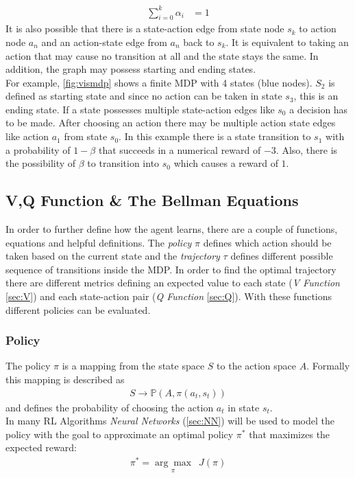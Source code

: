 \begin{align}
	\sum_{i=0}^{k} \alpha_i &= 1
\end{align}
\newline
It is also possible that there is a state-action edge from state node $s_k$ to action node $a_n$ and an action-state edge from $a_n$ back to $s_k$. 
It is equivalent to taking an action that may cause no transition at all and the state stays the same. In addition, the graph may possess starting and ending states.\\
For example, \cref{fig:vismdp} shows a finite MDP with 4 states (blue nodes). 
$S_2$ is defined as starting state and since no action can be taken in state $s_3$, this is an ending state. 
If a state possesses multiple state-action edges like $s_0$ a decision has to be made. 
After choosing an action there may be multiple action state edges like action $a_1$ from state $s_0$. 
In this example there is a state transition to $s_1$ with a probability of $1-\beta$ that succeeds in a numerical reward of $-3$. 
Also, there is the possibility of $\beta$ to transition into $s_0$ which causes a reward of $1$.

\newpage

\subsection{V,Q Function \& The Bellman Equations}
In order to further define how the agent learns, there are a couple of functions, equations and helpful definitions. 
The \emph{policy} $\pi$ defines which action should be taken based on the current state and the \emph{trajectory} $\tau$ 
defines different possible sequence of transitions inside the MDP. 
In order to find the optimal trajectory there are different metrics defining an expected value to each state (\emph{V Function} \cref{sec:V}) and each state-action pair (\emph{Q Function} \cref{sec:Q}). 
With these functions different policies can be evaluated. 

\subsubsection{Policy}
The policy $\pi$ is a mapping from the state space $S$ to the action space $A$. Formally this mapping is described as
\begin{align*}
	S \to \mathbb{P}(A, \pi (a_t,s_t))
\end{align*}
\newline
and defines the probability of choosing the action $a_t$ in state $s_t$.\\
In many RL Algorithms \emph{Neural Networks} (\cref{sec:NN}) will be used to model the policy with 
the goal to approximate an optimal policy $\pi^*$ that maximizes the expected reward:
\begin{align*}
	\pi^* = \underset{\pi} {\arg \max}\enspace J(\pi)
\end{align*}

